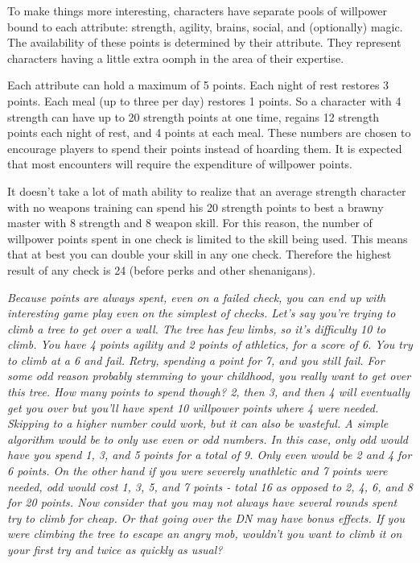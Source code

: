 \documentclass[twocolumn]{report}
\begin{document}
To make things more interesting, characters have separate pools of willpower bound to each attribute: strength, agility, brains, social, and (optionally) magic.  The availability of these points is determined by their attribute.  They represent characters having a little extra oomph in the area of their expertise.

Each attribute can hold a maximum of 5  points.  Each night of rest restores 3  points.  Each meal (up to three per day) restores 1  points.  So a character with 4 strength can have up to 20 strength points at one time, regains 12 strength points each night of rest, and 4 points at each meal.  These numbers are chosen to encourage players to spend their points instead of hoarding them.  It is expected that most encounters will require the expenditure of willpower points.

It doesn't take a lot of math ability to realize that an average strength character with no weapons training can spend his 20 strength points to best a brawny master with 8 strength and 8 weapon skill.  For this reason, the number of willpower points spent in one check is limited to the skill being used.  This means that at best you can double your skill in any one check.  Therefore the highest result of any check is 24 (before perks and other shenanigans).

\emph{
Because points are always spent, even on a failed check, you can end up with interesting game play even on the simplest of checks.  Let's say you're trying to climb a tree to get over a wall.  The tree has few limbs, so it's difficulty 10 to climb.  You have 4 points agility and 2 points of athletics, for a score of 6.  You try to climb at a 6 and fail.  Retry, spending a point for 7, and you still fail.  For some odd reason probably stemming to your childhood, you really want to get over this tree.  How many points to spend though?  2, then 3, and then 4 will eventually get you over but you'll have spent 10 willpower points where 4 were needed.  Skipping to a higher number could work, but it can also be wasteful.  A simple algorithm would be to only use even or odd numbers.  In this case, only odd would have you spend 1, 3, and 5 points for a total of 9.  Only even would be 2 and 4 for 6 points.  On the other hand if you were severely unathletic and 7 points were needed, odd would cost 1, 3, 5, and 7 points - total 16 as opposed to 2, 4, 6, and 8 for 20 points.  Now consider that you may not always have several rounds spent try to climb for cheap.  Or that going over the DN may have bonus effects.  If you were climbing the tree to escape an angry mob, wouldn't you want to climb it on your first try and twice as quickly as usual?  
}
\end{document}
